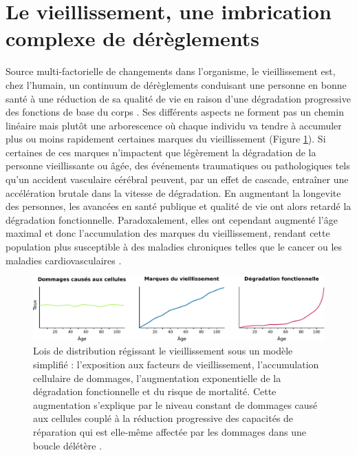 \section{Le vieillissement, une imbrication complexe de dérèglements}


Source multi-factorielle de changements dans l'\gls{organisme}, le vieillissement est, chez l'humain, un continuum de dérèglements conduisant une personne en bonne santé à une réduction de sa qualité de vie en raison d'une dégradation progressive des fonctions de base du corps \cite{Berrut2013}. Ses différents aspects ne forment pas un chemin linéaire mais plutôt une arborescence où chaque individu va tendre à accumuler plus ou moins rapidement certaines marques du vieillissement (Figure \ref{fig:aging_rate_marks}). Si certaines de ces marques n'impactent que légèrement la dégradation de la personne vieillissante ou âgée, des événements traumatiques ou pathologiques tels qu'un accident vasculaire cérébral peuvent, par un effet de cascade, entraîner une accélération brutale dans la vitesse de dégradation. En augmentant la \gls{longevite} des personnes, les avancées en santé publique et qualité de vie ont alors retardé la dégradation fonctionnelle. Paradoxalement, elles ont cependant augmenté l'âge maximal et donc l'accumulation des marques du vieillissement, rendant cette population plus susceptible à des maladies chroniques telles que le cancer ou les maladies cardiovasculaires \cite{Khan2017Aug}. 

\begin{figure}[ht]
    \centering
    \includegraphics[width=\textwidth]{img/intro/4_aging/intro_4_aging_rate_marks.pdf}
    \caption[Lois de distribution régissant le vieillissement sous un modèle simplifié]{Lois de distribution régissant le vieillissement sous un modèle simplifié : l'exposition aux facteurs de vieillissement, l'accumulation cellulaire de dommages, l'augmentation exponentielle de la dégradation fonctionnelle et du risque de mortalité. Cette augmentation s'explique par le niveau constant de dommages causé aux cellules couplé à la réduction progressive des capacités de réparation qui est elle-même affectée par les dommages dans une boucle délétère \cite{Todhunter2018}.}
    \label{fig:aging_rate_marks}
\end{figure}

